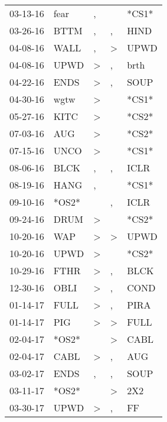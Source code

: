 \begin{supertabular}{lllll}
 03-13-16 &   fear &                , &                  &  *CS1* \\
 03-26-16 &   BTTM &                , &                , &   HIND \\
 04-08-16 &   WALL &                , &     \textgreater &   UPWD \\
 04-08-16 &   UPWD &     \textgreater &                , &   brth \\
 04-22-16 &   ENDS &     \textgreater &                , &   SOUP \\
 04-30-16 &   wgtw &     \textgreater &                  &  *CS1* \\
 05-27-16 &   KITC &     \textgreater &                  &  *CS2* \\
 07-03-16 &    AUG &     \textgreater &                  &  *CS2* \\
 07-15-16 &   UNCO &     \textgreater &                  &  *CS1* \\
 08-06-16 &   BLCK &                , &                , &   ICLR \\
 08-19-16 &   HANG &                , &                  &  *CS1* \\
 09-10-16 &  *OS2* &                  &                , &   ICLR \\
 09-24-16 &   DRUM &     \textgreater &                  &  *CS2* \\
 10-20-16 &    WAP &     \textgreater &     \textgreater &   UPWD \\
 10-20-16 &   UPWD &     \textgreater &                  &  *CS2* \\
 10-29-16 &   FTHR &     \textgreater &                , &   BLCK \\
 12-30-16 &   OBLI &     \textgreater &                , &   COND \\
 01-14-17 &   FULL &     \textgreater &                , &   PIRA \\
 01-14-17 &    PIG &     \textgreater &     \textgreater &   FULL \\
 02-04-17 &  *OS2* &                  &     \textgreater &   CABL \\
 02-04-17 &   CABL &     \textgreater &                , &    AUG \\
 03-02-17 &   ENDS &                , &                , &   SOUP \\
 03-11-17 &  *OS2* &                  &     \textgreater &    2X2 \\
 03-30-17 &   UPWD &     \textgreater &                , &     FF \\

\end{supertabular}
